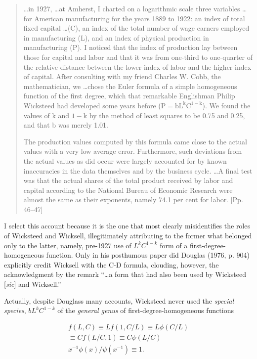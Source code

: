 \documentclass{article}
\begin{document}
\begin{quote}
\dots in 1927, \dots at Amherst, I charted on a logarithmic scale three variables \dots for American manufacturing for the years 1889 to 1922: an index of total fixed capital \dots (C), an index of the total number of wage earners employed in manufacturing (L), and an index of physical production in manufacturing (P). I noticed that the index of production lay between those for capital and labor and that it was from one-third to one-quarter of the relative distance between the lower index of labor and the higher index of capital. After consulting with my friend Charles W. Cobb, the mathematician, we \dots chose the Euler formula of a simple homogeneous function of the first degree, which that remarkable Englishman Philip Wicksteed had developed some years before (\(\mathrm P=\mathrm{bL^kC^{1-k}}\)). We found the values of \(\mathrm k\) and \(1-\mathrm k\) by the method of least squares to be 0.75 and 0.25, and that b was merely 1.01.

The production values computed by this formula came close to the actual values with a very low average error. Furthermore, such deviations from the actual values as did occur were largely accounted for by known inaccuracies in the data themselves and by the business cycle. \dots A final test was that the actual shares of the total product received by labor and capital according to the National Bureau of Economic Research were almost the same as their exponents, namely 74.1 per cent for labor. [Pp. 46--47]
\end{quote}

I select this account because it is the one that most clearly misidentifies the roles of Wicksteed and Wicksell, illegitimately attributing to the former what belonged only to the latter, namely, pre-1927 use of \(L^kC^{1-k}\) form of a first-degree-homogeneous function. Only in his posthumous paper did Douglas (1976, p. 904) explicitly credit Wicksell with the C-D formula, clouding, however, the acknowledgment by the remark ``\dots a form that had also been used by Wicksteed [\emph{sic}] and Wicksell.''


Actually, despite Douglass many accounts, Wicksteed never used the \emph{special species}, \(bL^kC^{1-k}\) of the \emph{general genus} of first-degree-homogeneous functions

\begin{equation}\label{eq1}
  \begin{gathered}
	f(L,C) \equiv Lf(1,C/L) \equiv L\phi(C/L) \\
	\equiv Cf(L/C,1) \equiv C\psi(L/C) \\
	x^{-1} \phi(x)/\psi(x^{-1}) \equiv 1.
  \end{gathered}
\end{equation}
\end{document}
